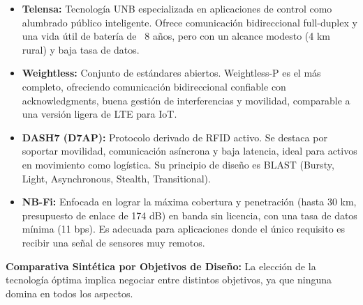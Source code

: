 \begin{itemize}
\begin{itemize}
                        que  le  otorga  un  gran  ancho   de   banda   y   alta
                        escalabilidad estructural. Ofrece la mayor tasa de datos
                        entre las tecnologías sin licencia  (624  kbps  uplink).
                        Sin embargo, su alcance es limitado (10 km rural) debido
                        a  la  mayor  atenuación  de  la  frecuencia   y   sufre
                        interferencia de otras tecnologías (Wi-Fi, Bluetooth).
                  \item \textbf{Telensa:} Tecnología UNB especializada en
                        aplicaciones   de   control   como   alumbrado   público
                        inteligente.    Ofrece    comunicación     bidireccional
                        full-duplex y una vida útil de batería de ~8 años,  pero
                        con un alcance modesto (4  km  rural)  y  baja  tasa  de
                        datos.
                  \item \textbf{Weightless:} Conjunto de estándares abiertos.
                        Weightless-P es el más completo, ofreciendo comunicación
                        bidireccional  confiable  con   acknowledgments,   buena
                        gestión de interferencias y movilidad, comparable a  una
                        versión ligera de LTE para IoT.
                  \item \textbf{DASH7 (D7AP):} Protocolo derivado de RFID
                        activo. Se destaca por soportar movilidad,  comunicación
                        asíncrona  y  baja  latencia,  ideal  para  activos   en
                        movimiento como logística. Su  principio  de  diseño  es
                        BLAST    (Bursty,    Light,    Asynchronous,    Stealth,
                        Transitional).
                  \item \textbf{NB-Fi:} Enfocada en lograr la máxima
                        cobertura y penetración (hasta  30  km,  presupuesto  de
                        enlace de 174 dB) en banda sin licencia, con una tasa de
                        datos mínima (11 bps).  Es  adecuada  para  aplicaciones
                        donde  el  único  requisito  es  recibir  una  señal  de
                        sensores muy remotos.
            \end{itemize}

\end{itemize}

\textbf{Comparativa Sintética por  Objetivos  de  Diseño:}  La  elección  de  la
tecnología óptima implica negociar entre distintos  objetivos,  ya  que  ninguna
domina en todos los aspectos.

